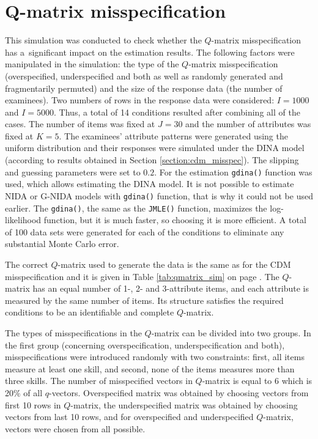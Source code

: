\documentclass[english]{pwr_wmat_praca_dyplomowa}
\theoremstyle{plain}
\numberwithin{theorem}{chapter}
\theoremstyle{definition}
\numberwithin{theorem}{chapter}
\begin{document}
	
	
	
	\newpage
	\section{Q-matrix misspecification}\label{section:qmat_misspec}
	
	This simulation was conducted to check whether the $Q$-matrix misspecification has a~significant impact on the estimation results. The following factors were manipulated in the simulation: the type of the $Q$-matrix misspecification (overspecified, underspecified and both \cite{m2statistic} as well as randomly generated and fragmentarily permuted) and the size of the response data (the number of examinees). Two numbers of rows in the response data were considered: $I = 1000$ and $I =5000$. Thus, a total of 14 conditions resulted after combining all of the cases. The number of items was fixed at $J=30$ and the number of attributes was fixed at $K=5$. The examinees’ attribute patterns were generated using the uniform distribution and their responses were simulated under the DINA model (according to results obtained in Section \ref{section:cdm_misspec}). The slipping and guessing parameters were set to $0.2$. For the estimation \texttt{gdina()} function was used, which allows estimating the DINA model. It is not possible to estimate NIDA or G-NIDA models with \texttt{gdina()} function, that is why it could not be used earlier. The \texttt{gdina()}, the same as the \texttt{JMLE()} function, maximizes the log-likelihood function, but it is much faster, so choosing it is more efficient. A total of 100 data sets were generated for each of the conditions to eliminate any substantial Monte Carlo error.
	
	The correct $Q$-matrix used to generate the data is the same as for the CDM misspecification and it is given in Table \ref{tab:qmatrix_sim} on page \pageref{tab:qmatrix_sim}. The $Q$-matrix has an equal number of 1-, 2- and 3-attribute items, and each attribute is measured by the same number of items. Its structure satisfies the required conditions to be an identifiable \cite{qmat_identifiability} and complete \cite{qmat_complete} $Q$-matrix. 
	
	The types of misspecifications in the $Q$-matrix can be divided into two groups. In the first group (concerning overspecification, underspecification and both), misspecifications were introduced randomly with two constraints: first, all items measure at least one skill, and second, none of the items measures more than three skills. The number of misspecified vectors in $Q$-matrix is equal to 6 which is 20\% of all $q$-vectors. Overspecified matrix was obtained by choosing vectors from first 10 rows in $Q$-matrix, the underspecified matrix was obtained by choosing vectors from last 10 rows, and for overspecified and underspecified $Q$-matrix, vectors were chosen from all possible. 
	
\end{document}
